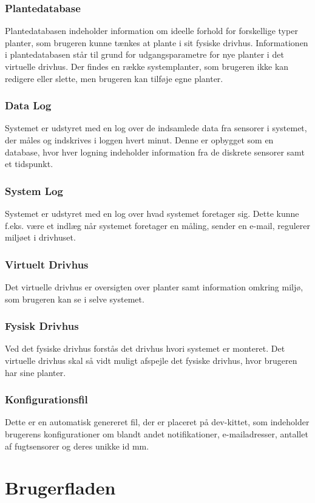 \subsubsection{Plantedatabase}
Plantedatabasen indeholder information om ideelle forhold for forskellige typer planter, som brugeren kunne tænkes at plante i sit fysiske drivhus. 
Informationen i plantedatabasen står til grund for udgangsparametre for nye planter i det virtuelle drivhus. Der findes en række systemplanter, som brugeren ikke kan redigere eller slette, men brugeren kan tilføje egne planter.
\subsubsection{Data Log}
Systemet er udstyret med en log over de indsamlede data fra sensorer i systemet, der måles og indskrives i loggen hvert minut. 
Denne er opbygget som en database, hvor hver logning indeholder information fra de diskrete sensorer samt et tidspunkt. 
\subsubsection{System Log}
Systemet er udstyret med en log over hvad systemet foretager sig. 
Dette kunne f.eks. være et indlæg når systemet foretager en måling, sender en e-mail, regulerer miljøet i drivhuset.
\subsubsection{Virtuelt Drivhus}
Det virtuelle drivhus er oversigten over planter samt information omkring miljø, som brugeren kan se i selve systemet. 
\subsubsection{Fysisk Drivhus}
Ved det fysiske drivhus forstås det drivhus hvori systemet er monteret. 
Det virtuelle drivhus skal så vidt muligt afspejle det fysiske drivhus, hvor brugeren har sine planter.
\subsubsection{Konfigurationsfil}
Dette er en automatisk genereret fil, der er placeret på dev-kittet, som indeholder brugerens konfigurationer om blandt andet notifikationer, e-mailadresser, antallet af fugtsensorer og deres unikke id mm.

\clearpage

\section{Brugerfladen}

